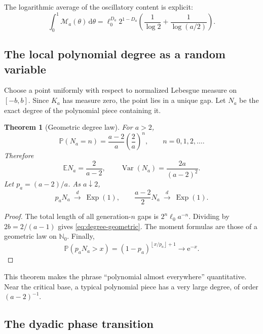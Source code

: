 \documentclass[11pt,oneside]{article}
\newtheorem{theorem}{Theorem}[section]
\theoremstyle{definition}
\theoremstyle{remark}
\newcommand{\N}{\mathbb N}
\newcommand{\e}{\mathrm e}
\newcommand{\dd}{\,\mathrm d}
\newcommand{\Var}{\operatorname{Var}}
\newcommand{\E}{\mathbb E}
\newcommand{\Prob}{\mathbb P}
\newcommand{\floor}[1]{\left\lfloor #1\right\rfloor}
\begin{document}
The logarithmic average of the oscillatory content is explicit:
\begin{equation}
 \int_0^1\mathcal M_a(\theta)\dd\theta
 =\ell_0^{D_a}2^{1-D_a}
 \left(\frac1{\log2}+\frac1{\log(a/2)}\right).
 \label{eq:average-Minkowski}
\end{equation}

\subsection{The local polynomial degree as a random variable}

Choose a point uniformly with respect to normalized Lebesgue measure on $[-b,b]$.
Since $K_a$ has measure zero, the point lies in a unique gap.  Let $N_a$ be the exact degree
of the polynomial piece containing it.

\begin{theorem}[Geometric degree law]
\label{thm:degree-law}
For $a>2$,
\begin{equation}
 \Prob(N_a=n)=\frac{a-2}{a}\left(\frac2a\right)^n,
 \qquad n=0,1,2,\ldots.
 \label{eq:degree-geometric}
\end{equation}
Therefore
\begin{equation}
 \E N_a=\frac2{a-2},
 \qquad
 \Var(N_a)=\frac{2a}{(a-2)^2}.
 \label{eq:degree-moments}
\end{equation}
Let $p_a=(a-2)/a$.  As $a\downarrow2$,
\begin{equation}
 p_aN_a\ \xrightarrow{\ d\ }\ \operatorname{Exp}(1),
 \qquad
 \frac{a-2}{2}N_a\ \xrightarrow{\ d\ }\ \operatorname{Exp}(1).
 \label{eq:degree-critical-limit}
\end{equation}
\end{theorem}

\begin{proof}
The total length of all generation-$n$ gaps is $2^n\ell_0a^{-n}$.  Dividing by
$2b=2/(a-1)$ gives \eqref{eq:degree-geometric}.  The moment formulas are those of a
geometric law on $\N_0$.  Finally,
\[
 \Prob(p_aN_a>x)=(1-p_a)^{\floor{x/p_a}+1}\longrightarrow\e^{-x}.
\]
\end{proof}

This theorem makes the phrase ``polynomial almost everywhere'' quantitative.  Near the
critical base, a typical polynomial piece has a very large degree, of order $(a-2)^{-1}$.

\subsection{The dyadic phase transition}
\end{document}
